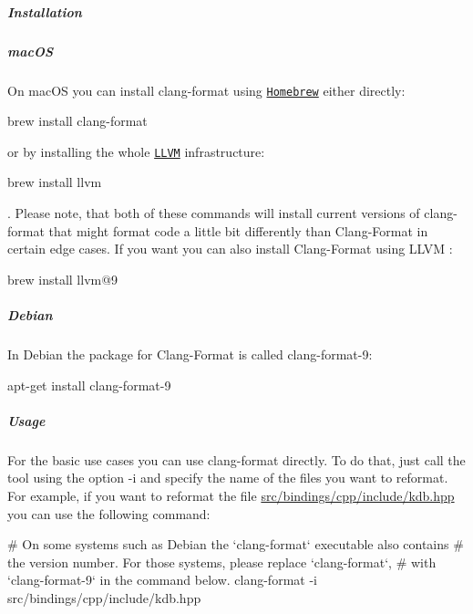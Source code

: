\label{invalid_invalid}%
%
\subparagraph*{Installation}

\subparagraph*{mac\+OS}

On mac\+OS you can install {\ttfamily clang-\/format} using \href{https://brew.sh}{\tt Homebrew} either directly\+:


\begin{DoxyCode}
brew install clang-format
\end{DoxyCode}


or by installing the whole \href{http://llvm.org}{\tt L\+L\+VM} infrastructure\+:


\begin{DoxyCode}
brew install llvm
\end{DoxyCode}


. Please note, that both of these commands will install current versions of {\ttfamily clang-\/format} that might format code a little bit differently than Clang-\/\+Format {} in certain edge cases. If you want you can also install Clang-\/\+Format {} using L\+L\+VM {}\+:


\begin{DoxyCode}
brew install llvm@9
\end{DoxyCode}


\subparagraph*{Debian}

In Debian the package for Clang-\/\+Format {} is called {\ttfamily clang-\/format-\/9}\+:


\begin{DoxyCode}
apt-get install clang-format-9
\end{DoxyCode}


\label{invalid_invalid}%
%
\subparagraph*{Usage}

For the basic use cases you can use {\ttfamily clang-\/format} directly. To do that, just call the tool using the option {\ttfamily -\/i} and specify the name of the files you want to reformat. For example, if you want to reformat the file {\ttfamily \hyperlink{kdb_8hpp}{src/bindings/cpp/include/kdb.\+hpp}} you can use the following command\+:


\begin{DoxyCode}
# On some systems such as Debian the `clang-format` executable also contains
# the version number. For those systems, please replace `clang-format`,
# with `clang-format-9` in the command below.
clang-format -i src/bindings/cpp/include/kdb.hpp
\end{DoxyCode}


